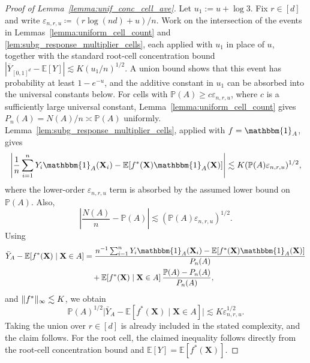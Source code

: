 \documentclass[11pt]{article}
\theoremstyle{plain}
\theoremstyle{definition}
\theoremstyle{remark}
\theoremstyle{plain}
\newcommand{\bX}{\mathbf{X}}
\DeclarePairedDelimiter{\norm}{\|}{\|}
\renewcommand{\P}{\mathbb{P}}
\newcommand{\E}{\mathbb{E}}
\newcommand{\1}{\mathbbm{1}}
\begin{document}
\begin{proof}[Proof of Lemma~\ref{lemma:unif_conc_cell_ave}]
Let $u_1:=u+\log 3$.
Fix $r\in[d]$ and write
$\varepsilon_{n,r,u}\coloneqq(r\log(nd)+u)/n$.
Work on the intersection of the events in
Lemmas~\ref{lemma:uniform_cell_count} and
\ref{lem:subg_response_multiplier_cells}, each applied with $u_1$ in
place of $u$, together with the standard root-cell concentration bound
$|\overline Y_{[0,1]^d}-\E[Y]|\lesssim K(u_1/n)^{1/2}$.
A union bound shows that this event has probability at least $1-e^{-u}$,
and the additive constant in $u_1$ can be absorbed into the universal
constants below.
For cells with
$\P(A)\ge c\varepsilon_{n,r,u}$, where $c$ is a sufficiently large
universal constant, Lemma~\ref{lemma:uniform_cell_count} gives
$P_n(A)=N(A)/n\asymp \P(A)$ uniformly.
Lemma~\ref{lem:subg_response_multiplier_cells}, applied with
$f=\1_A$, gives
\[
\left|
\frac1n\sum_{i=1}^n Y_i\1_A(\bX_i)
-
\E[f^*(\bX)\1_A(\bX)]
\right|
\lesssim
K(\P(A)\varepsilon_{n,r,u})^{1/2},
\]
where the lower-order $\varepsilon_{n,r,u}$ term is absorbed by the
assumed lower bound on $\P(A)$.
Also,
\[
\left|\frac{N(A)}{n}-\P(A)\right|
\lesssim
(\P(A)\varepsilon_{n,r,u})^{1/2}.
\]
Using
\begin{align*}
\bar Y_A-\E[f^*(\bX)\mid \bX\in A]
&=
\frac{n^{-1}\sum_{i=1}^n Y_i\1_A(\bX_i)-\E[f^*(\bX)\1_A(\bX)]}{P_n(A)}\\
&\quad+
\E[f^*(\bX)\mid \bX\in A]\,\frac{\P(A)-P_n(A)}{P_n(A)},
\end{align*}
and $\norm{f^*}_\infty\lesssim K$, we obtain
\[
\P(A)^{1/2}\bigl|\bar Y_A-\E[f^*(\bX)\mid \bX\in A]\bigr|
\lesssim
K \varepsilon_{n,r,u}^{1/2}.
\]
Taking the union over $r\in[d]$ is already included in the stated complexity, and the claim follows.
For the root cell, the claimed inequality follows directly from the
root-cell concentration bound and $\E[Y]=\E[f^*(\bX)]$.
\end{proof}
\end{document}
